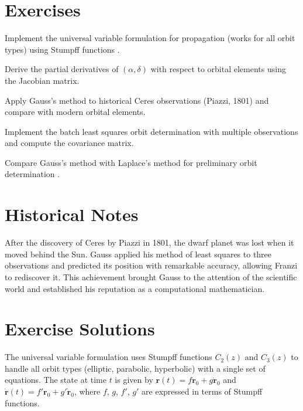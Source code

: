 \section{Exercises}

\begin{exercise}
Implement the universal variable formulation for propagation (works for all orbit types) using Stumpff functions .
\end{exercise}

\begin{exercise}
Derive the partial derivatives of $(\alpha, \delta)$ with respect to orbital elements using the Jacobian matrix.
\end{exercise}

\begin{exercise}
Apply Gauss's method to historical Ceres observations (Piazzi, 1801) and compare with modern orbital elements.
\end{exercise}

\begin{exercise}
Implement the batch least squares orbit determination with multiple observations and compute the covariance matrix.
\end{exercise}

\begin{exercise}
Compare Gauss's method with Laplace's method for preliminary orbit determination .
\end{exercise}

\section{Historical Notes}

After the discovery of Ceres by Piazzi in 1801, the dwarf planet was lost when it moved behind the Sun. Gauss applied his method of least squares to three observations and predicted its position with remarkable accuracy, allowing Franzi to rediscover it. This achievement brought Gauss to the attention of the scientific world and established his reputation as a computational mathematician.

\section{Exercise Solutions}

\begin{solution}
The universal variable formulation uses Stumpff functions $C_2(z)$ and $C_3(z)$ to handle all orbit types (elliptic, parabolic, hyperbolic) with a single set of equations. The state at time $t$ is given by $\mathbf{r}(t) = f\mathbf{r}_0 + g\dot{\mathbf{r}}_0$ and $\dot{\mathbf{r}}(t) = f'\mathbf{r}_0 + g'\dot{\mathbf{r}}_0$, where $f$, $g$, $f'$, $g'$ are expressed in terms of Stumpff functions.
\end{solution}

